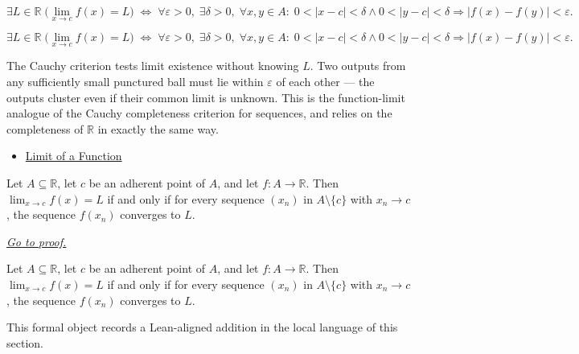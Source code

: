 \begin{remark*}
\[
  \exists L \in \mathbb{R}\;\bigl(\lim_{x\to c}f(x)=L\bigr)
  \;\iff\;
  \forall\varepsilon>0,\;\exists\delta>0,\;
  \forall x,y \in A :\;
  0<|x-c|<\delta \wedge 0<|y-c|<\delta
  \Rightarrow |f(x)-f(y)|<\varepsilon.
\]
\end{remark*}

\begin{remark*}
\[
\exists L \in \mathbb{R}\;\bigl(\lim_{x\to c}f(x)=L\bigr)
  \;\iff\;
  \forall\varepsilon>0,\;\exists\delta>0,\;
  \forall x,y \in A :\;
  0<|x-c|<\delta \wedge 0<|y-c|<\delta
  \Rightarrow |f(x)-f(y)|<\varepsilon.
\]
\end{remark*}

\begin{remark*}[Interpretation]
The Cauchy criterion tests limit existence without knowing $L$. Two
outputs from any sufficiently small punctured ball must lie within
$\varepsilon$ of each other --- the outputs cluster even if their
common limit is unknown. This is the function-limit analogue of the
Cauchy completeness criterion for sequences, and relies on the
completeness of $\mathbb{R}$ in exactly the same way.
\end{remark*}

\begin{dependencies}
\begin{itemize}
  \item \hyperref[def:limit-function]{Limit of a Function}
\end{itemize}
\end{dependencies}

\begin{theorem}
\label{thm:sequential-criterion-tendsto}
Let $A\subseteq\mathbb R$, let $c$ be an adherent point of $A$, and let $f:A\to\mathbb R$. Then $\lim_{x\to c}f(x)=L$ if and only if for every sequence $(x_n)$ in $A\setminus\{c\}$ with $x_n\to c$, the sequence $f(x_n)$ converges to $L$.

\smallskip
\noindent
\hyperref[prf:sequential-criterion-tendsto]{\textit{Go to proof.}}
\end{theorem}

\begin{remark*}
Let $A\subseteq\mathbb R$, let $c$ be an adherent point of $A$, and let $f:A\to\mathbb R$. Then $\lim_{x\to c}f(x)=L$ if and only if for every sequence $(x_n)$ in $A\setminus\{c\}$ with $x_n\to c$, the sequence $f(x_n)$ converges to $L$.
\end{remark*}

\begin{remark*}[Interpretation]
This formal object records a Lean-aligned addition in the local language of this section.
\end{remark*}

\begin{dependencies}
\NoLocalDependencies
\end{dependencies}
